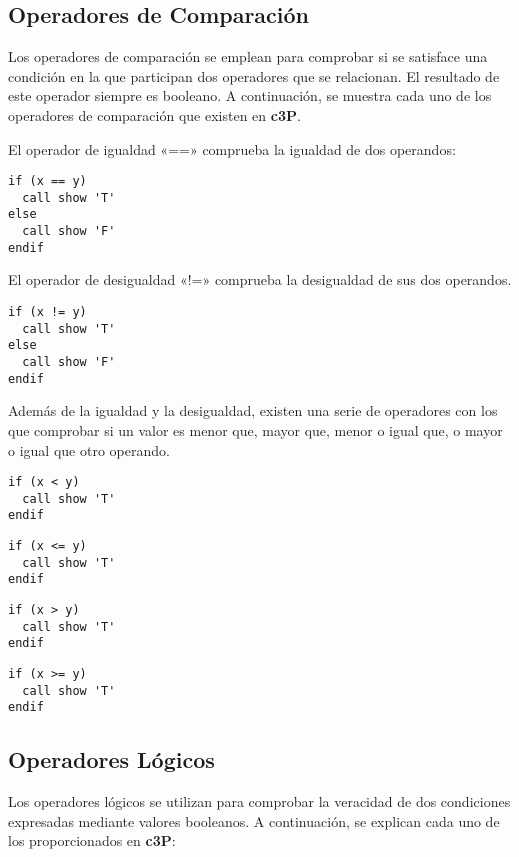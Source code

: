 \subsection{Operadores de Comparación}

Los operadores de comparación se emplean para comprobar si se satisface una condición
en la que participan dos operadores que se relacionan. El resultado de este operador
siempre es booleano. A continuación, se muestra cada uno de los operadores de comparación
que existen en \textbf{c3P}.

El operador de igualdad «==» comprueba la igualdad de dos operandos:

\begin{verbatim}
if (x == y)
  call show 'T'
else
  call show 'F'
endif
\end{verbatim}

El operador de desigualdad «!=» comprueba la desigualdad de sus dos operandos.

\begin{verbatim}
if (x != y)
  call show 'T'
else
  call show 'F'
endif
\end{verbatim}

Además de la igualdad y la desigualdad, existen una serie de operadores con los que
comprobar si un valor es menor que, mayor que, menor o igual que, o mayor o igual
que otro operando.

\begin{verbatim}
if (x < y)
  call show 'T'
endif
\end{verbatim}

\begin{verbatim}
if (x <= y)
  call show 'T'
endif
\end{verbatim}

\begin{verbatim}
if (x > y)
  call show 'T'
endif
\end{verbatim}

\begin{verbatim}
if (x >= y)
  call show 'T'
endif
\end{verbatim}

\subsection{Operadores Lógicos}

Los operadores lógicos se utilizan para comprobar la veracidad de dos
condiciones expresadas mediante valores booleanos. A continuación, se
explican cada uno de los proporcionados en \textbf{c3P}:

